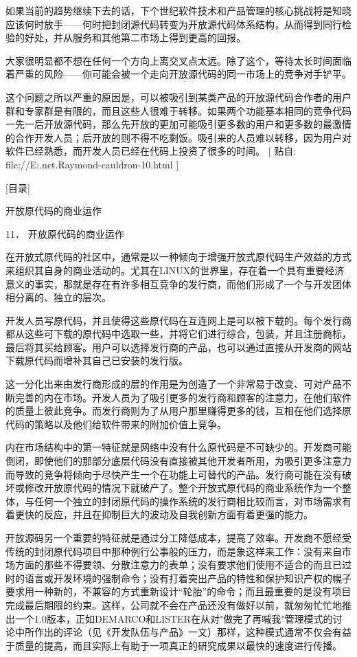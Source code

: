 \documentclass[a4paper,12pt,UTF8,twoside]{ctexbook}
\begin{document}
如果当前的趋势继续下去的话，下个世纪软件技术和产品管理的核心挑战将是知晓应该何时放手——何时把封闭源代码转变为开放源代码体系结构，从而得到同行检验的好处，并从服务和其他第二市场上得到更高的回报。


大家很明显都不想在任何一个方向上离交叉点太远。除了这个，等待太长时间面临着严重的风险——你可能会被一个走向开放源代码的同一市场上的竞争对手铲平。


这个问题之所以严重的原因是，可以被吸引到某类产品的开放源代码合作者的用户群和专家群是有限的，而且这些人很难于转移。如果两个功能基本相同的竞争代码一先一后开放源代码，那么先开放的更加可能吸引更多数的用户和更多数的最激情的合作开发人员；后开放的则不得不吃剩饭。吸引来的人员难以转移，因为用户对软件已经熟悉，而开发人员已经在代码上投资了很多的时间。
[ 贴自: file://E:\joyfire\joyfire.net\bible\Eric.Raymond\magic-cauldron-10.html ]

[目录]

开放原代码的商业运作

11． 开放原代码的商业运作

在开放式原代码的社区中，通常是以一种倾向于增强开放式原代码生产效益的方式来组织其自身的商业活动的。尤其在LINUX的世界里，存在着一个具有重要经济意义的事实，那就是存在有许多相互竞争的发行商，而他们形成了一个与开发团体相分离的、独立的层次。


开发人员写原代码，并且使得这些原代码在互连网上是可以被下载的。每个发行商都从这些可下载的原代码中选取一些，并将它们进行综合，包装，并且注册商标，最后将其买给顾客。用户可以选择发行商的产品，也可以通过直接从开发商的网站下载原代码而增补其自己已安装的发行版。


这一分化出来由发行商形成的层的作用是为创造了一个非常易于改变、可对产品不断完善的内在市场。开发人员为了吸引更多的发行商和顾客的注意力，在他们软件的质量上彼此竞争。而发行商则为了从用户那里赚得更多的钱，互相在他们选择原代码的策略以及他们给软件带来的附加价值上竞争。


内在市场结构中的第一特征就是网络中没有什么原代码是不可缺少的。开发商可能倒闭，即使他们的那部分底层代码没有直接被其他开发者所用，为吸引更多注意力而导致的竞争将倾向于尽快产生一个在功能上可替代的产品。发行商可能在没有破坏或修改开放原代码的情况下就破产了。整个开放式原代码的商业系统作为一个整体，与任何一个独立的封闭原代码的操作系统的发行商相比较而言，对市场需求有着更快的反应，并且在抑制巨大的波动及自我创新方面有着更强的能力。


开放源码另一个重要的特征就是通过分工降低成本，提高了效率。开发商不愿经受传统的封闭原代码项目中那种例行公事般的压力，而是象这样来工作：没有来自市场方面的那些不得要领、分散注意力的表单；没有要求他们使用不适合的而且已过时的语言或开发环境的强制命令；没有打着突出产品的特性和保护知识产权的幌子要求用一种新的，不兼容的方式重新设计“轮胎”的命令；而且最重要的是没有项目完成最后期限的约束。这样，公司就不会在产品还没有做好以前，就匆匆忙忙地推出一个1.0版本，正如DEMARCO和LISTER在从对"做完了再喊我"管理模式的讨论中所作出的评论（见《开发队伍与产品》一文）那样，这种模式通常不仅会有益于质量的提高，而且实际上有助于一项真正的研究成果以最快的速度进行传播。
\end{document}
